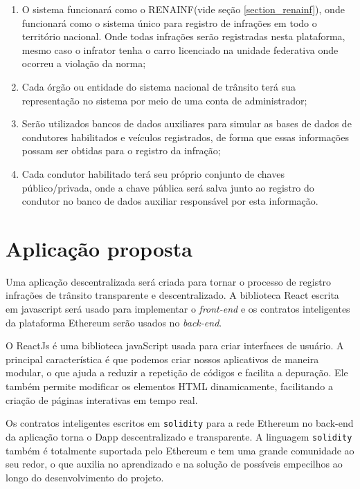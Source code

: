     \begin{enumerate}
        \item O sistema funcionará como o RENAINF(vide seção \ref{section_renainf}), onde funcionará como o sistema único para registro de infrações em todo o território nacional. Onde todas infrações serão registradas nesta plataforma, mesmo caso o infrator tenha o carro licenciado na unidade federativa onde ocorreu a violação da norma;
        \item Cada órgão ou entidade do sistema nacional de trânsito terá sua representação no sistema por meio de uma conta de administrador;
        \item Serão utilizados bancos de dados auxiliares para simular as bases de dados de condutores habilitados e veículos registrados, de forma que essas informações possam ser obtidas para o registro da infração;
        \item Cada condutor habilitado terá seu próprio conjunto de chaves público/privada, onde a chave pública será salva junto ao registro do condutor no banco de dados auxiliar responsável por esta informação.
    \end{enumerate}


\section{Aplicação proposta}

Uma aplicação descentralizada será criada para tornar o processo de registro infrações de trânsito transparente e descentralizado. A biblioteca React escrita em javascript será usado para implementar o \textit{front-end} e os contratos inteligentes da plataforma Ethereum serão usados no \textit{back-end}. 

O ReactJs é uma biblioteca javaScript usada para criar interfaces de usuário. A principal característica é que podemos criar nossos aplicativos de maneira modular, o que ajuda a reduzir a repetição de códigos e facilita a depuração. Ele também permite modificar os elementos HTML dinamicamente, facilitando a criação de páginas interativas em tempo real. 

Os contratos inteligentes escritos em \verb|solidity| para a rede Ethereum no back-end da aplicação torna o Dapp descentralizado e transparente. A linguagem \verb|solidity| também é totalmente suportada pelo Ethereum e tem uma grande comunidade ao seu redor, o que auxilia no aprendizado e na solução de possíveis empecilhos ao longo do desenvolvimento do projeto.

